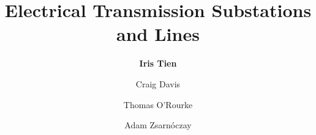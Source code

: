 %
%
%


%
%
%
%
%
%
%
%

\title{Electrical Transmission Substations and Lines}
\author{
    \textbf{Iris Tien}
    \and {Craig Davis}
    \and {Thomas O'Rourke}
    \and {Adam Zsarnóczay}}
\tocauthor{}
%
%
\maketitle

